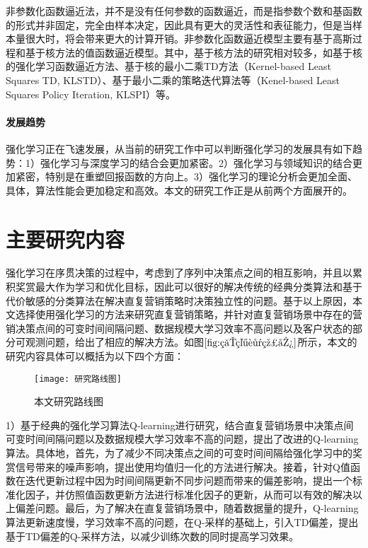 非参数化函数逼近法，并不是没有任何参数的函数逼近，而是指参数个数和基函数的形式并非固定，完全由样本决定，因此具有更大的灵活性和表征能力，但是当样本量很大时，将会带来更大的计算开销。非参数化函数逼近模型主要有基于高斯过程和基于核方法的值函数逼近模型。其中，基于核方法的研究相对较多，如基于核的强化学习函数逼近方法\citep{ormoneit2002kernel}、基于核的最小二乘TD方法（Kernel-based Least Squares TD, KLSTD）\citep{xu2005kernel}、基于最小二乘的策略迭代算法等（Kenel-based Least Squares Policy Iteration, KLSPI）\citep{xu2007kernel}等。

\paragraph{发展趋势}
强化学习正在飞速发展，从当前的研究工作中可以判断强化学习的发展具有如下趋势：1）强化学习与深度学习的结合会更加紧密。2）强化学习与领域知识的结合更加紧密，特别是在重塑回报函数的方向上。3）强化学习的理论分析会更加全面、具体，算法性能会更加稳定和高效。本文的研究工作正是从前两个方面展开的。

\section{主要研究内容}
强化学习在序贯决策的过程中，考虑到了序列中决策点之间的相互影响，并且以累积奖赏最大作为学习和优化目标，因此可以很好的解决传统的经典分类算法和基于代价敏感的分类算法在解决直复营销策略时决策独立性的问题。基于以上原因，本文选择使用强化学习的方法来研究直复营销策略，并针对直复营销场景中存在的营销决策点间的可变时间间隔问题、数据规模大学习效率不高问题以及客户状态的部分可观测问题，给出了相应的解决方法。如图$\ref{fig:研究路线图}$所示，本文的研究内容具体可以概括为以下四个方面：
\begin{figure}[htbp]
\centering
\texttt{[image: 研究路线图]}
\caption{本文研究路线图}
\label{fig:研究路线图}
\end{figure}

1）基于经典的强化学习算法Q-learning进行研究，结合直复营销场景中决策点间可变时间间隔问题以及数据规模大学习效率不高的问题，提出了改进的Q-learning算法。具体地，首先，为了减少不同决策点之间的可变时间间隔给强化学习中的奖赏信号带来的噪声影响，提出使用均值归一化的方法进行解决。接着，针对Q值函数在迭代更新过程中因为时间间隔更新不同步问题而带来的偏差影响，提出一个标准化因子，并仿照值函数更新方法进行标准化因子的更新，从而可以有效的解决以上偏差问题。最后，为了解决在直复营销场景中，随着数据量的提升，Q-learning算法更新速度慢，学习效率不高的问题，在Q-采样的基础上，引入TD偏差，提出基于TD偏差的Q-采样方法，以减少训练次数的同时提高学习效果。

